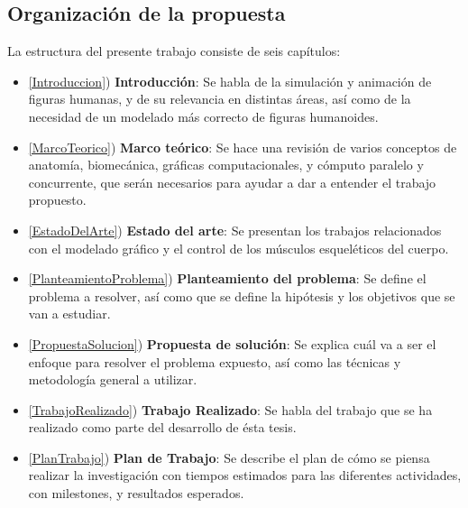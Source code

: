 \subsection{Organización de la propuesta}

La estructura del presente trabajo consiste de seis capítulos: 

\begin{itemize}
	\item \ref{Introduccion}) \textbf{Introducción}: Se habla de la simulación y animación de figuras humanas, y de su relevancia en distintas áreas, así como de la necesidad de un modelado más correcto de figuras humanoides.
	\item \ref{MarcoTeorico}) \textbf{Marco teórico}: Se hace una revisión de varios conceptos de anatomía, biomecánica, gráficas computacionales, y cómputo paralelo y concurrente, que serán necesarios para ayudar a dar a entender el trabajo propuesto. 
	\item \ref{EstadoDelArte}) \textbf{Estado del arte}: Se presentan los trabajos relacionados con el modelado gráfico y el control de los músculos esqueléticos del cuerpo.
	\item \ref{PlanteamientoProblema}) \textbf{Planteamiento del problema}: Se define el problema a resolver, así como que se define la hipótesis y los objetivos que se van a estudiar.
	\item \ref{PropuestaSolucion}) \textbf{Propuesta de solución}: Se explica cuál va a ser el enfoque para resolver el problema expuesto, así como las técnicas y metodología general a utilizar.
	\item \ref{TrabajoRealizado}) \textbf{Trabajo Realizado}: Se habla del trabajo que se ha realizado como parte del desarrollo de ésta tesis.
	\item \ref{PlanTrabajo}) \textbf{Plan de Trabajo}: Se describe el plan de cómo se piensa realizar la investigación con tiempos estimados para las diferentes actividades, con milestones, y resultados esperados.
\end{itemize}
















